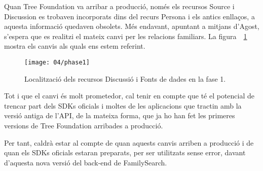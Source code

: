     Quan Tree Foundation va arribar a producció, només els recursos Source i Discussion es trobaven incorporats dins del recurs Persona i els antics enllaços, a aquesta informació quedaven obsolets. Més endavant, apuntant a mitjans d’Agost, s'espera que es realitzi el mateix canvi per les relacions familiars. La figura~~\ref{ref:phase1} mostra els canvis als quals ens estem referint.

    \begin{figure}[h]
        \texttt{[image: 04/phase1]}
        \centering
        \caption{Localització dels recursos Discussió i Fonts de dades en la fase 1.\label{ref:phase1}}
    \end{figure}

    Tot i que el canvi és molt prometedor, cal tenir en compte que té el potencial de trencar part dels SDKs oficials i moltes de les aplicacions que tractin amb la versió antiga de l'API, de la mateixa forma, que ja ho han fet les primeres versions de Tree Foundation arribades a producció.

    Per tant, caldrà estar al compte de quan aquests canvis arriben a producció i de quan els SDKs oficials estaran preparats, per ser utilitzats sense error, davant d'aquesta nova versió del back-end de FamilySearch.
